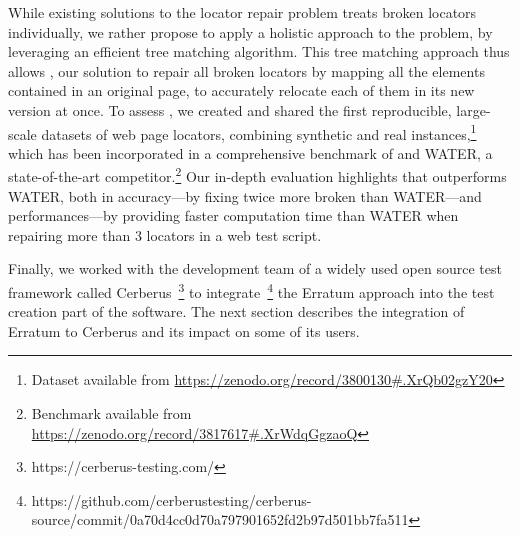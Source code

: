 While existing solutions to the locator repair problem treats broken locators individually, we rather propose to apply a holistic approach to the problem, by leveraging an efficient tree matching algorithm.
This tree matching approach thus allows \erratum{}, our solution to repair all broken locators by mapping all the elements contained in an original page, to accurately relocate each of them in its new version at once.
% 
To assess \erratum{}, we created and shared the first reproducible, large-scale datasets of web page locators, combining synthetic and real instances,\footnote{Dataset available from \url{https://zenodo.org/record/3800130\#.XrQb02gzY20}} which has been incorporated in a comprehensive benchmark of \erratum{} and WATER, a state-of-the-art competitor.\footnote{Benchmark available from \url{https://zenodo.org/record/3817617\#.XrWdqGgzaoQ}}
%
Our in-depth evaluation highlights that \erratum{} outperforms WATER, both in accuracy---by fixing twice more broken than WATER---and performances---by providing faster computation time than WATER when repairing more than 3 locators in a web test script.

Finally, we worked with the development team of a widely used open source test framework called Cerberus~\footnote{https://cerberus-testing.com/} to integrate~\footnote{https://github.com/cerberustesting/cerberus-source/commit/0a70d4cc0d70a797901652fd2b97d501bb7fa511} the Erratum approach into the test creation part of the software.
The next section describes the integration of Erratum to Cerberus and its impact on some of its users.

